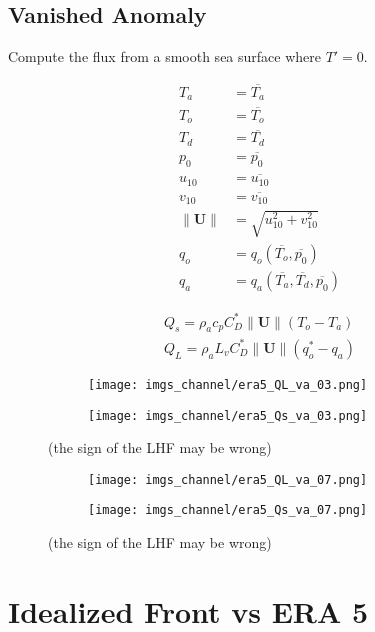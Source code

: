 \documentclass[12pt,a4paper]{article}
\newcommand{\Vmag}[1]{\| \mathbf{#1}\|}
\begin{document}
\subsection{Vanished Anomaly}
Compute the flux from a smooth sea surface where $T' = 0$.

\begin{align}
T_a &=\overline{T_a} \\
T_o &=\overline{T_o}  \\
T_d &=\overline{T_d} \\
p_0 &=\overline{p_0} \\
u_{10} &= \overline{u_{10}} \\
v_{10} &= \overline{v_{10}} \\
\Vmag{U} &= \sqrt{u_{10}^2 + v_{10}^2}\\
q_o &= q_o(\overline{T_o},\overline{p_0})\\
q_a &= q_a(\overline{T_a},\overline{T_d},\overline{p_0})
\end{align}


\begin{align}
Q_s = \rho_a c_p  C_D^* \Vmag{U} (T_o-T_a)\\
Q_L = \rho_a L_v  C_D^* \Vmag{U} (q_o^*-q_a)
\end{align}


\begin{figure}[h!]
\centering
\begin{subfigure}[t]{0.49\textwidth}
\texttt{[image: imgs\_channel/era5\_QL\_va\_03.png]}
\end{subfigure}
\begin{subfigure}[t]{0.49\textwidth}
\texttt{[image: imgs\_channel/era5\_Qs\_va\_03.png]}
\end{subfigure}
\caption{(the sign of the LHF may be wrong)}
\end{figure}


\begin{figure}[h!]
\centering
\begin{subfigure}[t]{0.49\textwidth}
\texttt{[image: imgs\_channel/era5\_QL\_va\_07.png]}
\end{subfigure}
\begin{subfigure}[t]{0.49\textwidth}
\texttt{[image: imgs\_channel/era5\_Qs\_va\_07.png]}
\end{subfigure}
\caption{(the sign of the LHF may be wrong)}
\end{figure}


\section{Idealized Front vs ERA 5}
\end{document}

